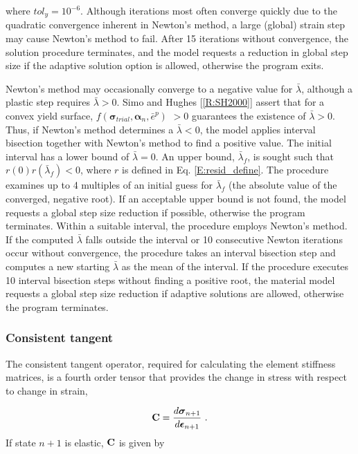 \documentclass[11pt]{report}
\numberwithin{equation}{section}
\newcommand{\bmf } {\boldsymbol }
\begin{document}
\noindent where $tol_y = 10^{-6}$.
Although iterations most often converge quickly due to the quadratic convergence 
inherent in Newton's method, a large (global) strain step may cause Newton's method 
to fail. After 15 iterations without convergence, the solution procedure terminates, and the model 
requests a reduction in global step size if the adaptive solution option 
is allowed, otherwise the program exits. 

Newton's method may occasionally converge to a negative value for $\bar \lambda$, 
although a plastic step requires $\bar \lambda > 0$. Simo and Hughes 
[\ref{R:SH2000}] assert that for a convex yield surface,  $f \left( \bmf\sigma_{trial},
\bmf\alpha_n, \bar e^p \right )$ $>0$  guarantees the existence of  
$\bar \lambda > 0$. Thus, if Newton's method determines a $\bar \lambda < 0$, the model applies 
interval bisection together with Newton's method to find a positive value. The initial interval 
has a lower bound of $\bar \lambda = 0$.
An upper bound, $\bar \lambda_f$, is sought such that 
$r\left(0\right)r\left(\bar \lambda_f\right)<0$, where $r$ is defined in Eq. \eqref{E:resid_define}. 
The procedure examines up to 4 multiples of an initial guess for $\bar \lambda_f$ (the 
absolute value of the converged, negative root). If an acceptable upper bound is not found, 
the model requests a global step size reduction if possible, otherwise the program terminates. 
Within a suitable interval, the procedure employs Newton's method. If the 
computed $\bar \lambda$
falls outside the interval or 10 consecutive Newton iterations occur without convergence, 
the procedure takes an interval bisection step and computes a new 
starting $\bar \lambda$ as the mean of the interval. If the procedure 
executes 10 interval bisection steps without finding a positive root, 
the material model requests a global step size reduction 
if adaptive solutions are allowed, otherwise the program terminates.


\subsubsection {Consistent tangent}
The consistent tangent operator, required for calculating the element stiffness matrices, 
is a fourth order tensor that provides the change in stress with respect 
to change in strain,

\begin{equation}
{\bf{C}} = \frac{{d{{\bmf{\sigma }}_{n + 1}}}}{{d{\bmf{\epsilon}_{n + 1}}}}~.
\end{equation}
\noindent If state $n+1$ is elastic, $\bf C$ is given by
\end{document}
